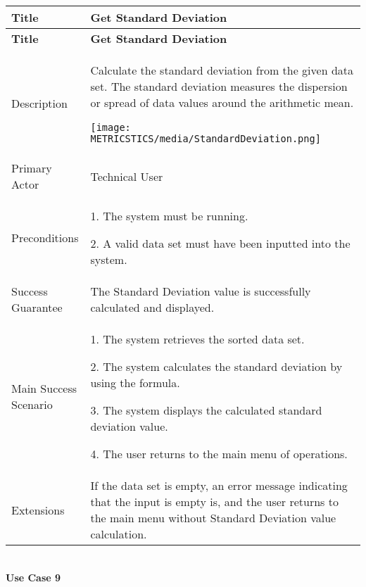     \begin{longtable}{|p{0.227\linewidth}|p{0.773\linewidth}|}
    \hline
    \textbf{Title} & \textbf{Get Standard Deviation} \\
    \hline
    \endfirsthead
    \hline
    \textbf{Title} & \textbf{Get Standard Deviation} \\
    \hline
    \endhead
    \hline
    \endfoot
    \hline
    \endlastfoot
    Description & Calculate the standard deviation from the given data set.
    The standard deviation measures the dispersion or spread of data values
    around the arithmetic mean.
    
    \texttt{[image: METRICSTICS/media/StandardDeviation.png]} \\ \hline
    Primary Actor & Technical User \\ \hline
    Preconditions & 1. The system must be running.
    
    2. A valid data set must have been inputted into the system. \\ \hline
    Success Guarantee & The Standard Deviation value is successfully
    calculated and displayed. \\ \hline
    Main Success Scenario & 1. The system retrieves the sorted data set.
    
    2. The system calculates the standard deviation by using the formula.
    
    3. The system displays the calculated standard deviation value.
    
    4. The user returns to the main menu of operations. \\ \hline
    Extensions & If the data set is empty, an error message indicating that
    the input is empty is, and the user returns to the main menu without
    Standard Deviation value calculation.
    \end{longtable}

    \strut \\
    \textbf{\large Use Case 9}
    

